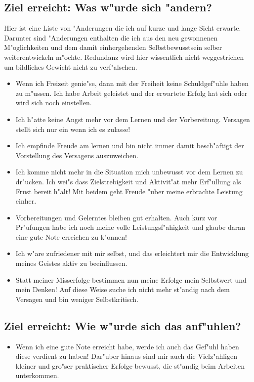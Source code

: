 \documentclass[11pt,a4paper,german]{article}
\begin{document}
\subsection{Ziel erreicht: Was w"urde sich "andern?}
Hier ist eine Liste von "Anderungen die ich auf kurze und lange Sicht erwarte. Darunter sind "Anderungen enthalten die ich aus den neu gewonnenen M"oglichkeiten und dem damit einhergehenden Selbstbewusstsein selber weiterentwickeln m"ochte. Redundanz wird hier wissentlich nicht weggestrichen um bildliches Gewicht nicht zu verf"alschen.
\begin{itemize}
	\item Wenn ich Freizeit genie"se, dann mit der Freiheit keine Schuldgef"uhle haben zu m"ussen. Ich habe Arbeit geleistet und der erwartete Erfolg hat sich oder wird sich noch einstellen.
	\item Ich h"atte keine Angst mehr vor dem Lernen und der Vorbereitung. Versagen stellt sich nur ein wenn ich es zulasse!
	\item Ich empfinde Freude am lernen und bin nicht immer damit besch"aftigt der Vorstellung des Versagens auszuweichen. 
	\item Ich komme nicht mehr in die Situation mich unbewusst vor dem Lernen zu dr"ucken. Ich wei"s dass Zielstrebigkeit und Aktivit"at mehr Erf"ullung als Frust bereit h"alt! Mit beidem geht Freude "uber meine erbrachte Leistung einher.
	\item Vorbereitungen und Gelerntes bleiben gut erhalten. Auch kurz vor Pr"ufungen habe ich noch meine volle Leistungsf"ahigkeit und glaube daran eine gute Note erreichen zu k"onnen!
	\item Ich w"are zufriedener mit mir selbst, und das erleichtert mir die Entwicklung meines Geistes aktiv zu beeinflussen.
	\item Statt meiner Misserfolge bestimmen nun meine Erfolge mein Selbstwert und mein Denken! Auf diese Weise suche ich nicht mehr st"andig nach dem Versagen und bin weniger Selbstkritisch.
\end{itemize}
\subsection{Ziel erreicht: Wie w"urde sich das anf"uhlen?}
\begin{itemize}
	\item Wenn ich eine gute Note erreicht habe, werde ich auch das Gef"uhl haben diese verdient zu haben! Dar"uber hinaus sind mir auch die Vielz"ahligen kleiner und gro"ser praktischer Erfolge bewusst, die st"andig beim Arbeiten unterkommen.
\end{itemize}
\end{document}
